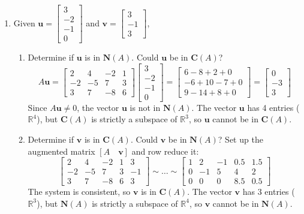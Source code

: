 \documentclass[../linear-algebra.tex]{subfiles}
\begin{document}
\begin{enumerate}
    \item Given $\mathbf{u} = \begin{bmatrix} 3 \\ -2 \\ -1 \\ 0 \end{bmatrix}$ and $\mathbf{v} = \begin{bmatrix} 3 \\ -1 \\ 3 \end{bmatrix}$,
    \begin{enumerate}
        \item Determine if $\mathbf{u}$ is in $\mathbf{N}(A)$. Could $\mathbf{u}$ be in $\mathbf{C}(A)$?\newline
        $$A\mathbf{u} = \begin{bmatrix} 2 & 4 & -2 & 1 \\ -2 & -5 & 7 & 3 \\ 3 & 7 & -8 & 6 \end{bmatrix} \begin{bmatrix} 3 \\ -2 \\ -1 \\ 0 \end{bmatrix} = \begin{bmatrix} 6 - 8 + 2 + 0 \\ -6 + 10 - 7 + 0 \\ 9 - 14 + 8 + 0 \end{bmatrix} = \begin{bmatrix} 0 \\ -3 \\ 3 \end{bmatrix}$$
        Since $A\mathbf{u} \neq 0$, the vector $\mathbf{u}$ is not in $\mathbf{N}(A)$.\newline
        The vector $\mathbf{u}$ has 4 entries ($\mathbb{R}^4$), but $\mathbf{C}(A)$ is strictly a subspace of $\mathbb{R}^3$, so $\mathbf{u}$ cannot be in $\mathbf{C}(A)$.
    
        \item Determine if $\mathbf{v}$ is in $\mathbf{C}(A)$. Could $\mathbf{v}$ be in $\mathbf{N}(A)$?\newline
        Set up the augmented matrix $[A \quad \mathbf{v}]$ and row reduce it:
        $$\begin{bmatrix} 2 & 4 & -2 & 1 & 3 \\ -2 & -5 & 7 & 3 & -1 \\ 3 & 7 & -8 & 6 & 3 \end{bmatrix} \sim \dots \sim \begin{bmatrix} 1 & 2 & -1 & 0.5 & 1.5 \\ 0 & -1 & 5 & 4 & 2 \\ 0 & 0 & 0 & 8.5 & 0.5 \end{bmatrix}$$
        The system is consistent, so $\mathbf{v}$ is in $\mathbf{C}(A)$.\newline
        The vector $\mathbf{v}$ has 3 entries ($\mathbb{R}^3$), but $\mathbf{N}(A)$ is strictly a subspace of $\mathbb{R}^4$, so $\mathbf{v}$ cannot be in $\mathbf{N}(A)$.
    \end{enumerate}
\end{enumerate}
\end{document}

